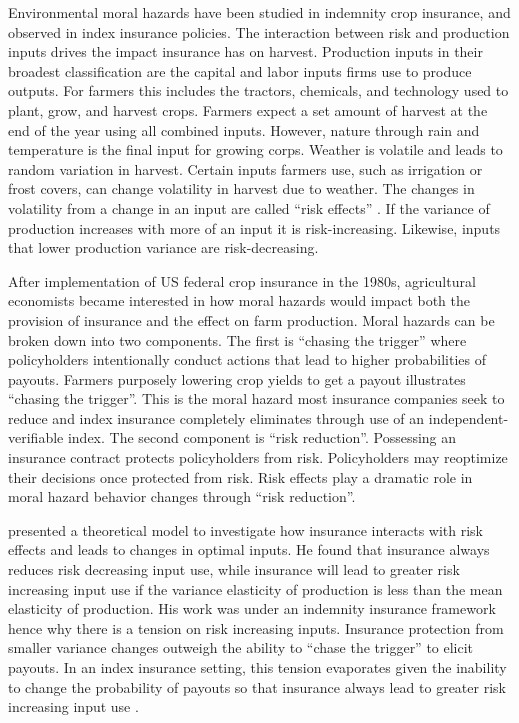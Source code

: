 \documentclass[
  super,
  preprint,
  3p]{elsarticle}
\theoremstyle{plain}
\theoremstyle{plain}
\theoremstyle{remark}
\begin{document}
Environmental moral hazards have been studied in indemnity crop
insurance, and observed in index insurance policies. The interaction
between risk and production inputs drives the impact insurance has on
harvest. Production inputs in their broadest classification are the
capital and labor inputs firms use to produce outputs. For farmers this
includes the tractors, chemicals, and technology used to plant, grow,
and harvest crops. Farmers expect a set amount of harvest at the end of
the year using all combined inputs. However, nature through rain and
temperature is the final input for growing corps. Weather is volatile
and leads to random variation in harvest. Certain inputs farmers use,
such as irrigation or frost covers, can change volatility in harvest due
to weather. The changes in volatility from a change in an input are
called ``risk effects'' \citep{Just1979}. If the variance of production
increases with more of an input it is risk-increasing. Likewise, inputs
that lower production variance are risk-decreasing.

After implementation of US federal crop insurance in the 1980s,
agricultural economists became interested in how moral hazards would
impact both the provision of insurance and the effect on farm
production. Moral hazards can be broken down into two components. The
first is ``chasing the trigger'' where policyholders intentionally
conduct actions that lead to higher probabilities of payouts. Farmers
purposely lowering crop yields to get a payout illustrates ``chasing the
trigger''. This is the moral hazard most insurance companies seek to
reduce and index insurance completely eliminates through use of an
independent-verifiable index. The second component is ``risk
reduction''. Possessing an insurance contract protects policyholders
from risk. Policyholders may reoptimize their decisions once protected
from risk. Risk effects play a dramatic role in moral hazard behavior
changes through ``risk reduction''.

\citet{Ramaswami1993} presented a theoretical model to investigate how
insurance interacts with risk effects and leads to changes in optimal
inputs. He found that insurance always reduces risk decreasing input
use, while insurance will lead to greater risk increasing input use if
the variance elasticity of production is less than the mean elasticity
of production. His work was under an indemnity insurance framework hence
why there is a tension on risk increasing inputs. Insurance protection
from smaller variance changes outweigh the ability to ``chase the
trigger'' to elicit payouts. In an index insurance setting, this tension
evaporates given the inability to change the probability of payouts so
that insurance always lead to greater risk increasing input use
\citep{Mahul2001}.
\end{document}
